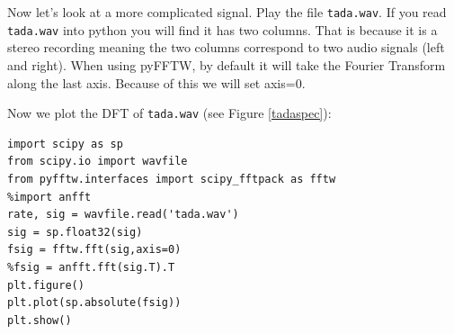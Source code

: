 Now let's look at a more complicated signal. Play the file \texttt{tada.wav}.  If you read \texttt{tada.wav} into python you will find it has two columns.  That is because it is a stereo recording meaning the two columns correspond to two audio signals (left and right).  When using pyFFTW, by default it will take the Fourier Transform along the last axis.  Because of this we will set axis=0. 


Now we plot the DFT of \texttt{tada.wav} (see Figure \ref{tadaspec}):
\begin{lstlisting}
import scipy as sp
from scipy.io import wavfile
from pyfftw.interfaces import scipy_fftpack as fftw
%import anfft
rate, sig = wavfile.read('tada.wav')
sig = sp.float32(sig)
fsig = fftw.fft(sig,axis=0)
%fsig = anfft.fft(sig.T).T
plt.figure()
plt.plot(sp.absolute(fsig))
plt.show()
\end{lstlisting}


